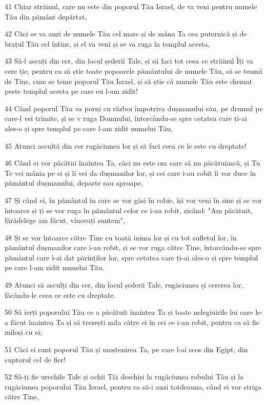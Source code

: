 \par 41 Chiar străinul, care nu este din poporul Tău Israel, de va veni pentru numele Tău din pământ depărtat,
\par 42 Căci se va auzi de numele Tău cel mare și de mâna Ta cea puternică și de brațul Tău cel întins, și el va veni și se va ruga la templul acesta,
\par 43 Să-l ascuți din cer, din locul șederii Tale, și să faci tot ceea ce străinul Îți va cere ție, pentru ca să știe toate popoarele pământului de numele Tău, să se teamă de Tine, cum se teme poporul Tău Israel, și să știe că numele Tău este chemat peste templul acesta pe care eu l-am zidit!
\par 44 Când poporul Tău va porni cu război împotriva dușmanului său, pe drumul pe care-l vei trimite, și se v ruga Domnului, întorcându-se spre cetatea care ți-ai ales-o și spre templul pe care l-am zidit numelui Tău,
\par 45 Atunci ascultă din cer rugăciunea lor și să faci ceea ce le este cu dreptate!
\par 46 Când ei vor păcătui înaintea Ta, căci nu este om care să nu păcătuiască, și Tu Te vei mânia pe ei și îi vei da dușmanilor lor, și cei care i-au robit îi vor duce în pământul dușmanului, departe sau aproape,
\par 47 Și când ei, în pământul în care se vor găsi în robie, își vor veni în sine și se vor întoarce și ți se vor ruga în pământul celor ce i-au robit, zicând: "Am păcătuit, fărădelege am făcut, vinovați suntem",
\par 48 Și se vor întoarce către Tine cu toată inima lor și cu tot sufletul lor, în pământul dușmanilor care i-au robit, și se vor ruga către Tine, întorcându-se spre pământul care l-ai dat părinților lor, spre cetatea care ți-ai ales-o și spre templul pe care l-am zidit numelui Tău,
\par 49 Atunci să asculți din cer, din locul șederii Tale, rugăciunea și cererea lor, făcându-le ceea ce este cu dreptate.
\par 50 Să ierți poporului Tău ce a păcătuit înaintea Ta și toate nelegiuirile lui care le-a făcut înaintea Ta și să trezești mila către ei în cei ce i-au robit, pentru ca să fie miloși cu ei;
\par 51 Căci ei sunt poporul Tău și moștenirea Ta, pe care l-ai scos din Egipt, din cuptorul cel de fier!
\par 52 Să-ți fie urechile Tale și ochii Tăi deschiși la rugăciunea robului Tău și la rugăciunea poporului Tău Israel, pentru ca să-i auzi totdeauna, când ei vor striga către Tine,
